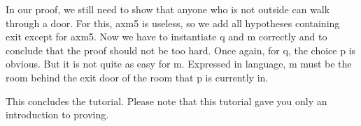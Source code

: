In our proof, we still need to show that anyone who is not \textsf{outside} can walk through a door. For this, \textsf{axm5} is useless, so we add all hypotheses containing exit except for \textsf{axm5}. Now we have to instantiate \textsf{q} and \textsf{m} correctly and to conclude that the proof should not be too hard. Once again, for \textsf{q}, the choice \textsf{p} is obvious. But it is not quite as easy for \textsf{m}. Expressed in language, \textsf{m} must be the room behind the exit door of the room that \textsf{p} is currently in. 


This concludes the tutorial. Please note that this tutorial gave you only an introduction to proving.

